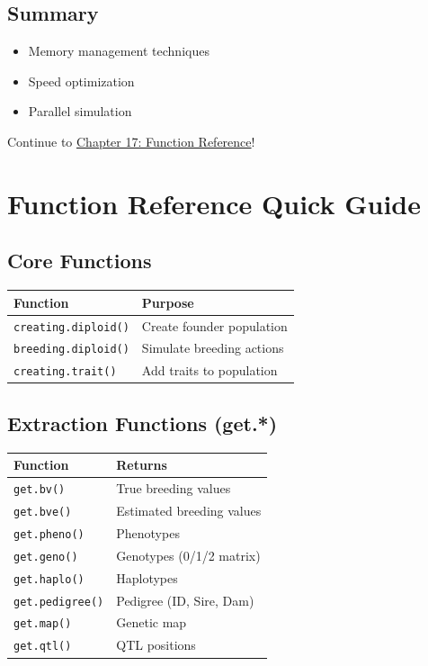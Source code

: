 \documentclass[
  letterpaper,
]{book}
\providecommand{\tightlist}{%
  \setlength{\itemsep}{0pt}\setlength{\parskip}{0pt}}
\begin{document}
\section{Summary}\label{summary-15}

\begin{itemize}
\tightlist
\item
  Memory management techniques
\item
  Speed optimization
\item
  Parallel simulation
\end{itemize}

Continue to \href{17-function-reference.qmd}{Chapter 17: Function
Reference}!

\chapter{Function Reference Quick Guide}\label{sec-function-reference}

\section{Core Functions}\label{core-functions}

\begin{longtable}[]{@{}ll@{}}
\toprule\noalign{}
Function & Purpose \\
\midrule\noalign{}
\endhead
\bottomrule\noalign{}
\endlastfoot
\texttt{creating.diploid()} & Create founder population \\
\texttt{breeding.diploid()} & Simulate breeding actions \\
\texttt{creating.trait()} & Add traits to population \\
\end{longtable}

\section{Extraction Functions (get.*)}\label{extraction-functions-get.}

\begin{longtable}[]{@{}ll@{}}
\toprule\noalign{}
Function & Returns \\
\midrule\noalign{}
\endhead
\bottomrule\noalign{}
\endlastfoot
\texttt{get.bv()} & True breeding values \\
\texttt{get.bve()} & Estimated breeding values \\
\texttt{get.pheno()} & Phenotypes \\
\texttt{get.geno()} & Genotypes (0/1/2 matrix) \\
\texttt{get.haplo()} & Haplotypes \\
\texttt{get.pedigree()} & Pedigree (ID, Sire, Dam) \\
\texttt{get.map()} & Genetic map \\
\texttt{get.qtl()} & QTL positions \\
\end{longtable}
\end{document}
